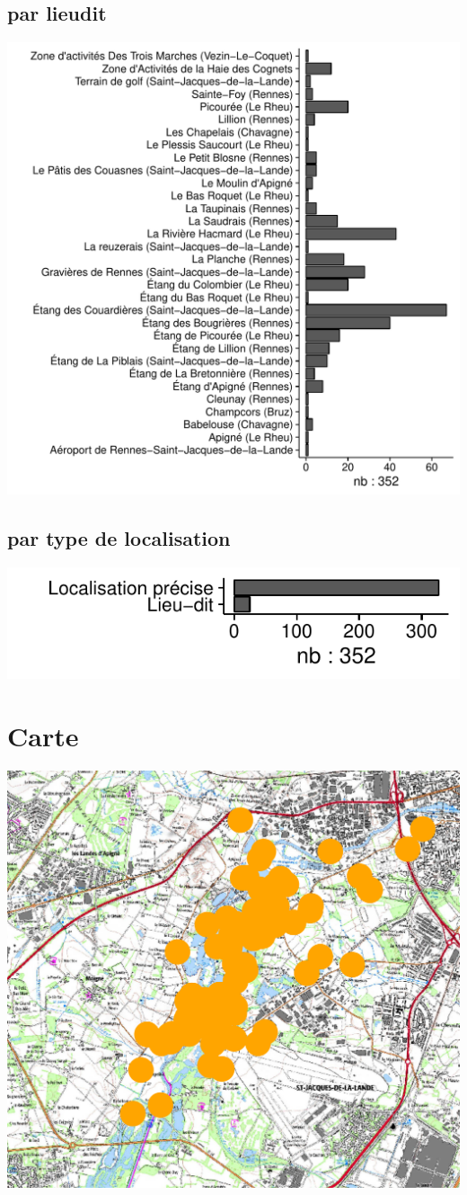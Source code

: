 \subsection*{par lieudit}
\includegraphics[width=\malargeurgraphique]{images/faune_stat_champ_PLACE.pdf}
\subsection*{par type de localisation}
\includegraphics[width=\malargeurgraphique]{images/faune_stat_champ_PRECISION.pdf}
\clearpage
\section*{Carte}
\includegraphics[width=\textwidth]{images/faune_carte.pdf}